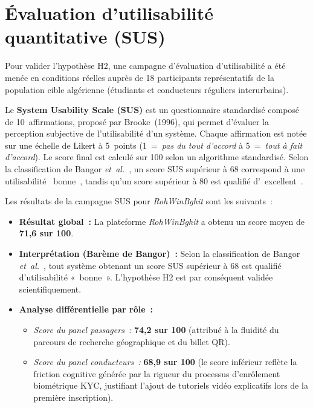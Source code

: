 \section{Évaluation d'utilisabilité quantitative (SUS)}
\label{sec:tests-sus}

Pour valider l'hypothèse H2, une campagne d'évaluation d'utilisabilité a été menée en conditions réelles auprès de 18 participants représentatifs de la population cible algérienne (étudiants et conducteurs réguliers interurbains).

Le \textbf{System Usability Scale (SUS)} est un questionnaire standardisé composé de 10~affirmations, proposé par Brooke~(1996), qui permet d'évaluer la perception subjective de l'utilisabilité d'un système. Chaque affirmation est notée sur une échelle de Likert à 5~points (1~=~\textit{pas du tout d'accord} à 5~=~\textit{tout à fait d'accord}). Le score final est calculé sur 100 selon un algorithme standardisé. Selon la classification de Bangor \textit{et~al.}~\cite{Bangor2008}, un score SUS supérieur à 68 correspond à une utilisabilité \guillemotleft~bonne~\guillemotright, tandis qu'un score supérieur à 80 est qualifié d'\guillemotleft~excellent~\guillemotright.

Les résultats de la campagne SUS pour \textit{RohWinBghit} sont les suivants~:
\begin{itemize}[leftmargin=1.8em]
  \item \textbf{Résultat global~:} La plateforme \textit{RohWinBghit} a obtenu un score moyen de \textbf{71,6 sur 100}.
  \item \textbf{Interprétation (Barème de Bangor)~:} Selon la classification de Bangor \textit{et~al.}~\cite{Bangor2008}, tout système obtenant un score SUS supérieur à 68 est qualifié d'utilisabilité «~bonne~». L'hypothèse H2 est par conséquent validée scientifiquement.
  \item \textbf{Analyse différentielle par rôle~:}
  \begin{itemize}
    \item \textit{Score du panel passagers~:} \textbf{74,2 sur 100} (attribué à la fluidité du parcours de recherche géographique et du billet QR).
    \item \textit{Score du panel conducteurs~:} \textbf{68,9 sur 100} (le score inférieur reflète la friction cognitive générée par la rigueur du processus d'enrôlement biométrique KYC, justifiant l'ajout de tutoriels vidéo explicatifs lors de la première inscription).
  \end{itemize}
\end{itemize}

